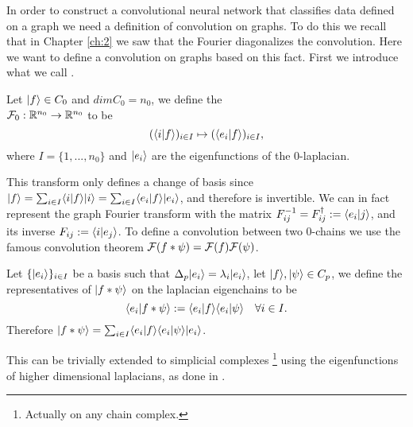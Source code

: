 \documentclass[../3.tex]{subfiles}
\begin{document}
    In order to construct a convolutional neural network that classifies data defined on a graph we need a definition of convolution on graphs.
    To do this we recall that in Chapter \ref{ch:2} we saw that the Fourier diagonalizes the convolution. Here we want to define a convolution on graphs
    based on this fact. First we introduce what we call .
    
    \begin{defn}
        Let $| f \rangle \in C_0$ and $dimC_0 = n_0$, we define the \\
        $\mathcal{F}_0 : \mathbb{R}^{n_0} \to \mathbb{R}^{n_0}$ to be
        \[ (\langle i | f \rangle)_{i \in I} \mapsto (\langle e_i | f \rangle)_{i \in I},\]
        where $I = \{1,...,n_0\}$ and $| e_i \rangle$ are the eigenfunctions of the $0$-laplacian.
    \end{defn}

    This transform only defines a change of basis since $| f \rangle = \sum_{i \in I}\langle i | f \rangle| i \rangle = \sum_{i \in I}\langle e_i | f \rangle| e_i \rangle$, and therefore is invertible.
    We can in fact represent the graph Fourier transform with the matrix $F^{-1}_{ij} = F^\dagger_{ij} := \langle e_i | j \rangle$, and its inverse $F_{ij} := \langle i | e_j \rangle$.
    To define a convolution between two $0$-chains we use the famous convolution theorem $\mathcal{F}(f * \psi) = \mathcal{F}(f)\mathcal{F}(\psi)$. 

    \begin{defn}
        Let $\{| e_i \rangle\}_{i \in I}$ be a basis such that $\Delta_p| e_i \rangle = \lambda_i| e_i \rangle$, let $| f \rangle,| \psi \rangle \in C_p$, we define the representatives of $| f * \psi \rangle$ on
        the laplacian eigenchains to be 
        \[ \langle e_i | f * \psi \rangle := \langle e_i | f \rangle\langle e_i | \psi \rangle \quad \forall i \in I.\]
        Therefore $| f * \psi \rangle = \sum_{i \in I}\langle e_i | f \rangle\langle e_i | \psi \rangle| e_i \rangle$.
    \end{defn}

    This can be trivially extended to simplicial complexes \footnote{Actually on any chain complex.} using the eigenfunctions of higher dimensional laplacians, as done in \cite{simplicialNN}.
\end{document}

